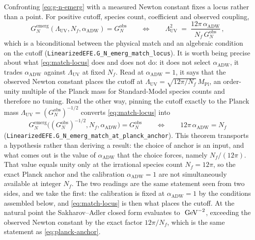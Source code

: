 \documentclass[aps,prd,nofootinbib,superscriptaddress,12pt]{revtex4-2}
\DeclareRobustCommand{\lb}{\discretionary{}{}{}}
\begin{document}
Confronting \eqref{eq:g-n-emerg} with a measured Newton constant fixes a locus
rather than a point. For positive cutoff, species count, coefficient and
observed coupling,
\begin{equation}
\label{eq:match-locus}
G_N^{\mathrm{emerg}}(\Lambda_{\mathrm{UV}}, N_f, \alpha_{\mathrm{ADW}})
= G_N^{\mathrm{obs}}
\qquad\Longleftrightarrow\qquad
\Lambda_{\mathrm{UV}}^{2}
\;=\; \frac{12\pi\,\alpha_{\mathrm{ADW}}}{N_f\,G_N^{\mathrm{obs}}}\,,
\end{equation}
which is a biconditional between the physical match and an algebraic condition
on the cutoff (\texttt{Linearized\lb{}EFE.\lb{}G\_\lb{}N\_\lb{}emerg\_\lb{}match\_\lb{}locus}). It is worth
being precise about what \eqref{eq:match-locus} does and does not do: it does
not select $\alpha_{\mathrm{ADW}}$, it trades $\alpha_{\mathrm{ADW}}$ against
$\Lambda_{\mathrm{UV}}$ at fixed $N_f$. Read at $\alpha_{\mathrm{ADW}} = 1$, it
says that the observed Newton constant places the cutoff at
$\Lambda_{\mathrm{UV}} = \sqrt{12\pi/N_f}\,M_{\mathrm{Pl}}$, an order-unity
multiple of the Planck mass for Standard-Model species counts and therefore no
tuning. Read the other way, pinning the cutoff exactly to the Planck mass
$\Lambda_{\mathrm{UV}} = (G_N^{\mathrm{obs}})^{-1/2}$ converts
\eqref{eq:match-locus} into
\begin{equation}
\label{eq:planck-anchor}
G_N^{\mathrm{emerg}}\bigl((G_N^{\mathrm{obs}})^{-1/2}, N_f,
  \alpha_{\mathrm{ADW}}\bigr) = G_N^{\mathrm{obs}}
\qquad\Longleftrightarrow\qquad
12\pi\,\alpha_{\mathrm{ADW}} = N_f
\end{equation}
(\texttt{Linearized\lb{}EFE.\lb{}G\_\lb{}N\_\lb{}emerg\_\lb{}match\_\lb{}at\_\lb{}planck\_\lb{}anchor}). This theorem
transports a hypothesis rather than deriving a result: the choice of anchor is
an input, and what comes out is the value of $\alpha_{\mathrm{ADW}}$ that the
choice forces, namely $N_f/(12\pi)$. That value equals unity only at the
irrational species count $N_f = 12\pi$, so the exact Planck anchor and the
calibration $\alpha_{\mathrm{ADW}} = 1$ are not simultaneously available at
integer $N_f$. The two readings are the same statement seen from two sides, and
we take the first: the calibration is fixed at $\alpha_{\mathrm{ADW}} = 1$ by
the conditions assembled below, and \eqref{eq:match-locus} is then what places
the cutoff. At the natural point the Sakharov--Adler closed form evaluates to
$\unskip\ \mathrm{GeV}^{-2}$,
exceeding the observed Newton constant by the exact factor $12\pi/N_f$, which
is the same statement as \eqref{eq:planck-anchor}.
\end{document}
